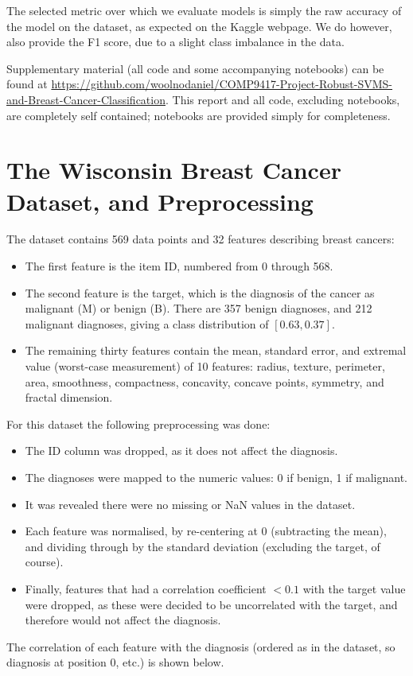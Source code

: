 \documentclass[11pt]{article}
\begin{document}
The selected metric over which we evaluate models is simply the raw accuracy of the model on the dataset, as expected on the Kaggle webpage. We do however, also provide the F1 score, due to a slight class imbalance in the data.

Supplementary material (all code and some accompanying notebooks) can be found at \url{https://github.com/woolnodaniel/COMP9417-Project-Robust-SVMS-and-Breast-Cancer-Classification}. This report and all code, excluding notebooks, are completely self contained; notebooks are provided simply for completeness.

\section{The Wisconsin Breast Cancer Dataset, and Preprocessing}

The dataset contains 569 data points and 32 features describing breast cancers:
\begin{itemize}
	\item The first feature is the item ID, numbered from 0 through 568. 
	\item The second feature is the target, which is the diagnosis of the cancer as malignant (M) or benign (B). There are 357 benign diagnoses, and 212 malignant diagnoses, giving a class distribution of $[0.63, 0.37]$. 
	\item The remaining thirty features contain the mean, standard error, and extremal value (worst-case measurement) of 10 features: radius, texture, perimeter, area, smoothness, compactness, concavity, concave points, symmetry, and fractal dimension. 
\end{itemize}
For this dataset the following preprocessing was done:
\begin{itemize}
	\item The ID column was dropped, as it does not affect the diagnosis. 
	\item The diagnoses were mapped to the numeric values: 0 if benign, 1 if malignant. 
	\item It was revealed there were no missing or NaN values in the dataset. 
	\item Each feature was normalised, by re-centering at 0 (subtracting the mean), and dividing through by the standard deviation (excluding the target, of course). 
	\item Finally, features that had a correlation coefficient $< 0.1$ with the target value were dropped, as these were decided to be uncorrelated with the target, and therefore would not affect the diagnosis. 
\end{itemize}
The correlation of each feature with the diagnosis (ordered as in the dataset, so diagnosis at position 0, etc.) is shown below. 
\end{document}
